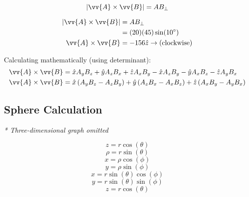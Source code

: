 \documentclass{article}
\begin{document}

$$ | \vv{A} \times \vv{B} | = AB_{\perp} $$


\begin{align*}
    |\vv{A} \times \vv{B}| & = AB_{\perp} \\
                           & = (20)(45) \sin(10 \degree) \\
    \vv{A} \times \vv{B} & = -156 \hat{z} \rightarrow \text{(clockwise)}
\end{align*}

Calculating mathematically (using determinant):
\begin{align*}
    \vv{A}\times\vv{B} & = \hat{x}A_{y}B_{z}+\hat{y}A_{z}B_{x}+\hat{z}A_{x}B_{y}-\hat{x}A_{z}B_{y}-\hat{y}A_{x}B_{z}-\hat{z}A_{y}B_{x} \\
    \vv{A}\times\vv{B} & = \hat{x} \left( A_{y}B_{z}-A_{z}B_{y} \right) + \hat{y} \left( A_{z}B_{x}-A_{x}B_{z} \right) + \hat{z} \left( A_{x}B_{y}-A_{y}B_{x} \right)
\end{align*}

\subsection{Sphere Calculation}

\textit{* Three-dimensional graph omitted}

$$ z = r \cos(\theta) $$
$$ \rho = r \sin(\theta) $$
$$ x = \rho \cos(\phi) $$
$$ y = \rho \sin(\phi) $$
$$ x = r \sin(\theta) \cos(\phi) $$
$$ y = r \sin(\theta) \sin(\phi) $$
$$ z = r \cos(\theta) $$
\end{document}
